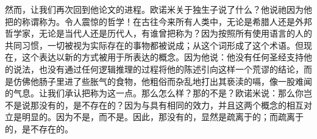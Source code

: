 然而，让我们再次回到他论文的进程。欧诺米关于独生子说了什么？他说祂因为他把的称谓称为。令人震惊的哲学！在古往今来所有人类中，无论是希腊人还是外邦哲学家，无论是当代人还是历代人，有谁曾把称为？因为按照所有使用语言的人的共同习惯，一切被视为实际存在的事物都被说成；从这个词形成了这个术语。但现在，这个表达以新的方式被用于所表达的概念。因为他说：他没有任何圣经支持他的说法，也没有通过任何逻辑推理的过程将他的陈述引向这样一个荒谬的结论，而是仿佛他肠子里进了些胀气的食物，他粗俗而杂乱地打出其亵渎的嗝，像一股难闻的气息。让我们承认把称为这一点。那么怎么样？那的不是？欧诺米说：那么你岂不是说那没有的，是不存在的？因为与具有相同的效力，并且这两个概念的相互对立是明显的。因为不是，而不是。因此，那没有的，显然是疏离于的；而疏离于的，是不存在的。\par


